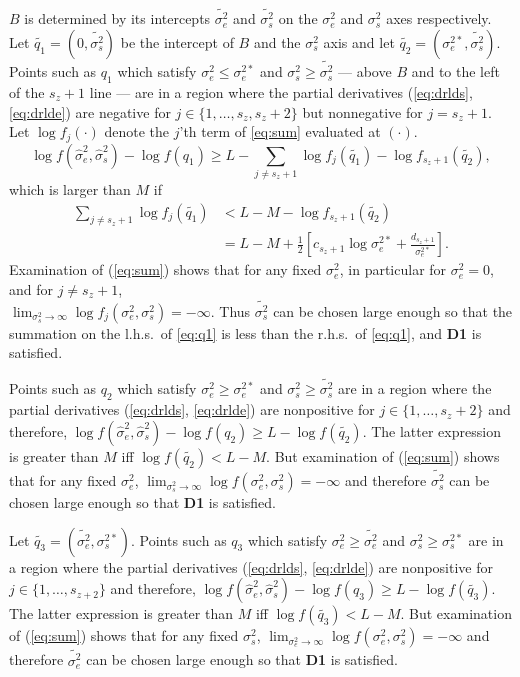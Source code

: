 \documentclass{report}
\newcommand{\RL}{f}
\newcommand{\logRL}{\log\RL}
\newcommand{\sigssq}{\sigma_s^2}
\newcommand{\sigesq}{\sigma_e^2}
\newcommand{\sshat}{\hat\sigma^2_e,\hat\sigma^2_s}
\newcommand{\logRLss}{\logRL(\sigesq,\sigssq)}
\begin{document}
$B$ is determined by its intercepts $\widetilde{\sigma_e^2}$ and $\widetilde{\sigma_s^2}$ on the $\sigesq$ and $\sigssq$ axes respectively.  Let $\widetilde{q_1} = (0,\widetilde{\sigma_s^2})$ be the intercept of $B$ and the $\sigssq$ axis and let $\widetilde{q_2} = (\sigma_e^{2*},\widetilde{\sigma_s^2})$. Points such as $q_1$ which satisfy $\sigesq \le \sigma_e^{2*}$ and $\sigssq \ge \widetilde{\sigma_s^2}$ --- above $B$ and to the left of the $s_z+1$ line --- are in a region where the partial derivatives (\ref{eq:drlds}, \ref{eq:drlde}) are negative for $j \in \{1, \dots, s_z, s_z+2\}$ but nonnegative for $j=s_z+1$.  Let $\logRL_j(\cdot)$ denote the $j$'th term of \eqref{eq:sum} evaluated at $(\cdot)$.  
\begin{equation}
	\logRL(\sshat) - \logRL(q_1) \ge L - \sum_{j \ne s_z+1} \logRL_j(\widetilde{q_1}) - \logRL_{s_z+1}(\widetilde{q_2}),
\end{equation}
which is larger than $M$ if
\begin{equation}
\label{eq:q1}
  \begin{split}
    \sum_{j \ne s_z+1} \logRL_j(\widetilde{q_1})
      &< L - M - \logRL_{s_z+1}(\widetilde{q_2})\\
      &= L - M + \frac{1}{2} \left[ c_{s_z+1}\log\sigma_e^{2*} + \frac{d_{s_z+1}}{\sigma_e^{2*}}\right].
  \end{split}
\end{equation}
Examination of (\ref{eq:sum}) shows that for any fixed $\sigesq$, in particular for $\sigesq=0$, and for $j \ne s_z+1$,\\ $\lim_{\sigssq \rightarrow \infty} \logRL_j(\sigesq,\sigssq) = -\infty$.  Thus $\widetilde{\sigma_s^2}$ can be chosen large enough so that the summation on the l.h.s.~of \eqref{eq:q1} is less than the r.h.s.~of \eqref{eq:q1}, and  \textbf{D1} is satisfied.

Points such as $q_2$ which satisfy $\sigesq \ge \sigma_e^{2*}$ and $\sigssq \ge \widetilde{\sigma_s^2}$ are in a region where the partial derivatives (\ref{eq:drlds}, \ref{eq:drlde}) are nonpositive for $j \in \{1, \dots, s_z+2\}$ and therefore, $\logRL(\sshat) - \logRL(q_2) \ge L - \logRL(\widetilde{q_2})$.  The latter expression is greater than $M$ iff $\logRL(\widetilde{q_2}) < L-M$.  But examination of (\ref{eq:sum}) shows that for any fixed $\sigesq$, $\lim_{\sigssq \rightarrow \infty} \logRLss = -\infty$ and therefore $\widetilde{\sigma_s^2}$ can be chosen large enough so that \textbf{D1} is satisfied.

Let $\widetilde{q_3} = (\widetilde{\sigma_e^2}, \sigma_s^{2*})$.  Points such as $q_3$ which satisfy $\sigesq \ge \widetilde{\sigma_e^2}$ and $\sigssq \ge \sigma_s^{2*}$ are in a region where the partial derivatives (\ref{eq:drlds}, \ref{eq:drlde}) are nonpositive for $j \in \{1, \dots, s_{z+2}\}$ and therefore, $\logRL(\sshat) - \logRL(q_3) \ge L - \logRL(\widetilde{q_3})$.  The latter expression is greater than $M$ iff $\logRL(\widetilde{q_3}) < L-M$.  But examination of (\ref{eq:sum}) shows that for any fixed $\sigssq$, $\lim_{\sigesq \rightarrow \infty} \logRLss = -\infty$ and therefore $\widetilde{\sigma_e^2}$ can be chosen large enough so that \textbf{D1} is satisfied.
\end{document}
